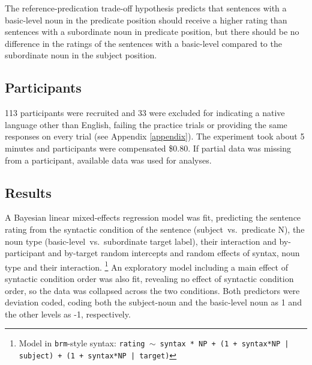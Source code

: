 The reference-predication trade-off hypothesis predicts that sentences with a basic-level noun in the predicate position should receive a higher rating than sentences with a subordinate noun in predicate position, but there should be no difference in the ratings of the sentences with a basic-level compared to the subordinate noun in the subject position.  

\subsection{Participants}
113 participants were recruited and 33 were excluded for indicating a native language other than English, failing the practice trials or providing the same responses on every trial (see Appendix \ref{appendix}). The experiment took about 5 minutes and participants were compensated \$0.80. If partial data was missing from a participant, available data was used for analyses. 
\subsection{Results}
A Bayesian linear mixed-effects regression model was fit, predicting the sentence rating from the syntactic condition of the sentence (subject~vs.~predicate N), the noun type (basic-level~vs.~subordinate target label), their interaction and by-participant and by-target random intercepts and random effects of syntax, noun type and their interaction. \footnote{Model in \texttt{brm}-style syntax: \texttt{rating $\sim$ syntax * NP + (1 + syntax*NP | subject) + (1 + syntax*NP | target)}} 
An exploratory model including a main effect of syntactic condition order was also fit, revealing no effect of syntactic condition order, so the data was collapsed across the two conditions. Both predictors were deviation coded, coding both the subject-noun and the basic-level noun as 1 and the other levels as -1, respectively. 

